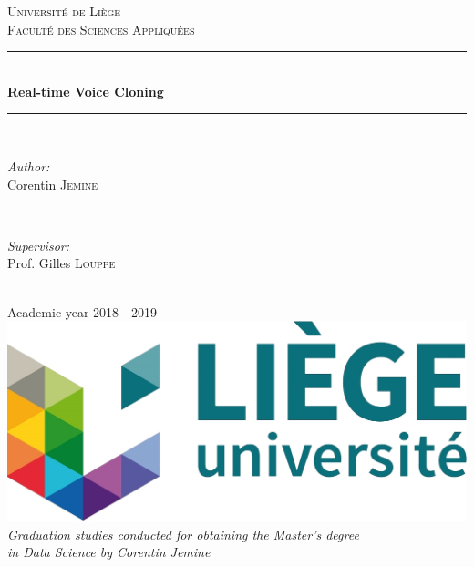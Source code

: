 \documentclass[a4paper, oneside, 12pt, english]{article}
\begin{document}
\begin{titlepage}
	\newcommand{\HRule}{\rule{\linewidth}{0.5mm}}
	\center
	\textsc{\LARGE Université de Liège}\\[1cm]
	\textsc{\Large Faculté des Sciences Appliquées}\\[2cm]
		
	\HRule \\[0.5cm]
	{ \huge \bfseries Real-time Voice Cloning}\\[0.2cm]
	\HRule \\[2cm]

	\begin{minipage}{0.4\textwidth}
		\begin{flushleft} \Large
			\emph{Author:}\\
			Corentin \textsc{Jemine}
		\end{flushleft}
	\end{minipage}
	~
	\begin{minipage}{0.4\textwidth}
		\begin{flushright} \Large
			\emph{Supervisor:} \\
			Prof. Gilles \textsc{Louppe}
		\end{flushright}
	\end{minipage}\\[4cm]
	
	{\LARGE Academic year 2018 - 2019}\\[1cm]
	
	\includegraphics{images/uliege_logo.jpg}\\[1.25cm]
	
	\textit{Graduation studies conducted for obtaining the Master's degree \\in Data Science by Corentin Jemine}
	
	\vfill
\end{titlepage}
\setcounter{page}{2}
\end{document}
